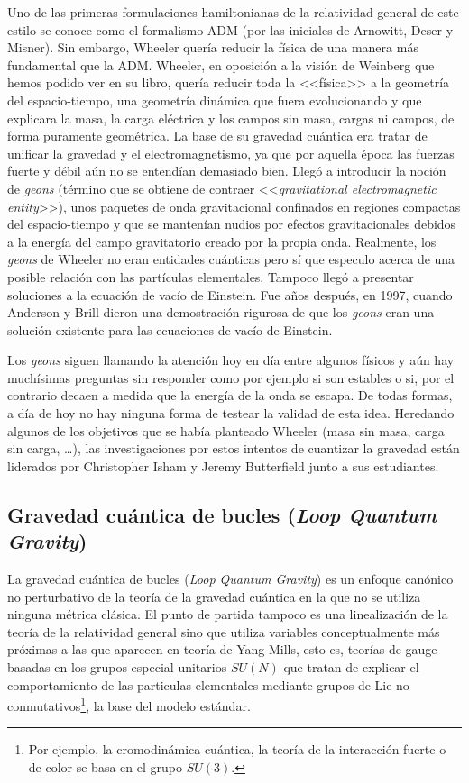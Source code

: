 \documentclass[11pt,a4paper,titlepage]{article}
\begin{document}
Uno de las primeras formulaciones hamiltonianas de la relatividad general de este estilo se conoce como el formalismo ADM (por las iniciales de Arnowitt, Deser y Misner). Sin embargo, Wheeler quería reducir la física de una manera más fundamental que la ADM. Wheeler, en oposición a la visión de Weinberg que hemos podido ver en su libro, quería reducir toda la <<física>> a la geometría del espacio-tiempo, una geometría dinámica que fuera evolucionando y que explicara la masa, la carga eléctrica y los campos sin masa, cargas ni campos, de forma puramente geométrica. La base de su gravedad cuántica era tratar de unificar la gravedad y el electromagnetismo, ya que por aquella época las fuerzas fuerte y débil aún no se entendían demasiado bien. Llegó a introducir la noción de \emph{geons} (término que se obtiene de contraer <<\emph{gravitational electromagnetic entity}>>), unos paquetes de onda gravitacional confinados en regiones compactas del espacio-tiempo y que se mantenían nudios por efectos gravitacionales debidos a la energía del campo gravitatorio creado por la propia onda. Realmente, los \emph{geons} de Wheeler no eran entidades cuánticas pero sí que especulo acerca de una posible relación con las partículas elementales. Tampoco llegó a presentar soluciones a la ecuación de vacío de Einstein. Fue años después, en 1997, cuando Anderson y Brill \cite{geons} dieron una demostración rigurosa de que los \emph{geons} eran una solución existente para las ecuaciones de vacío de Einstein.

Los \emph{geons} siguen llamando la atención hoy en día entre algunos físicos y aún hay muchísimas preguntas sin responder como por ejemplo si son estables o si, por el contrario decaen a medida que la energía de la onda se escapa. De todas formas, a día de hoy no hay ninguna forma de testear la validad de esta idea. Heredando algunos de los objetivos que se había planteado Wheeler (masa sin masa, carga sin carga, \dots), las investigaciones por estos intentos de cuantizar la gravedad están liderados por Christopher Isham y Jeremy Butterfield junto a sus estudiantes.

\subsection{Gravedad cuántica de bucles (\textit{Loop Quantum Gravity})}

La gravedad cuántica de bucles (\textit{Loop Quantum Gravity}) es un enfoque canónico no perturbativo de la teoría de la gravedad cuántica en la que no se utiliza ninguna métrica clásica. El punto de partida tampoco es una linealización de la teoría de la relatividad general sino que utiliza variables conceptualmente más próximas a las que aparecen en teoría de Yang-Mills, esto es, teorías de gauge basadas en los grupos especial unitarios $SU(N)$ que tratan de explicar el comportamiento de las particulas elementales mediante grupos de Lie no conmutativos\footnote{Por ejemplo, la cromodinámica cuántica, la teoría de la interacción fuerte o de color se basa en el grupo $SU(3)$.}, la base del modelo estándar.
\end{document}

